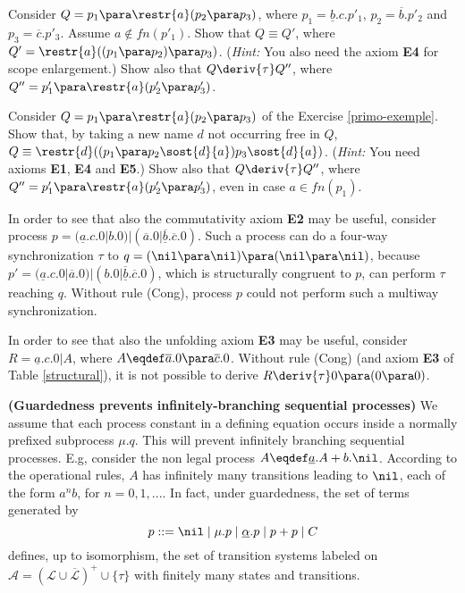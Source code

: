 \begin{exercise}\label{primo-exemple}
Consider $Q = p_1 \para \restr{a}(p_2 \para p_3)$, where $p_1 = \underline{b}.c.p'_1$, $p_2 = \overline{b}.p'_2$ 
and $p_3 = \overline{c}.p'_3$. Assume $a \not\in fn(p'_1)$. Show that $Q \equiv Q'$, 
where $Q' = \restr{a}((p_1 \para p_2) \para p_3)$.
({\em Hint:} You also need the axiom {\bf E4} for scope enlargement.) 
Show also that $Q \deriv{\tau} Q''$, where $Q'' =  p'_1 \para \restr{a}(p'_2 \para p'_3)$.
\fine
\end{exercise}

\begin{exercise}
Consider $Q = p_1 \para \restr{a}(p_2 \para p_3)$ of the Exercise \ref{primo-exemple}. Show that, by taking a new name $d$
not occurring free in $Q$, $Q \equiv \restr{d}((p_1 \para p_2\sost{d}{a}) p_3\sost{d}{a})$.
({\em Hint:} You need axioms {\bf E1}, {\bf E4} and {\bf E5}.) 
Show also that $Q \deriv{\tau} Q''$, where $Q'' =  p'_1 \para \restr{a}(p'_2 \para p'_3)$, even in case $a \in fn(p_1)$.
\fine
\end{exercise}


\begin{example}\label{comm-needed}
In order to see that also the commutativity axiom {\bf E2} may be useful, consider process $p = 
 (\underline{a}.c.0 | b.0) | (\overline{a}.0 | \underline{\overline{b}}.\overline{c}.0)$. Such a process
 can do a four-way synchronization $\tau$ to $q = (\nil \para \nil) \para (\nil \para \nil)$, because $p' = 
 (\underline{a}.c.0 | \overline{a}.0) | (b.0 | \underline{\overline{b}}.\overline{c}.0)$, which is structurally 
 congruent to $p$, can perform $\tau$ reaching $q$.
Without rule (Cong), process $p$ could not perform such a multiway synchronization.
\fine
\end{example}

\begin{example}\label{ax-cons-needed}
In order to see that also the unfolding axiom {\bf E3} may be useful, 
consider $R = \underline{a}.c.0 | A$, where $A \eqdef \overline{a}.0 \para \overline{c}.0$. Without rule (Cong) 
(and axiom {\bf E3} of Table \ref{structural}),
it is not possible to derive $R \deriv{\tau} 0 \para (0 \para 0)$. 
\fine
\end{example}


\begin{remark}\label{guarded-rec}{\bf (Guardedness prevents infinitely-branching sequential processes)} 
We assume that each process constant in a defining equation occurs
inside a normally prefixed subprocess $\mu.q$. This will prevent infinitely branching sequential processes.
E.g, consider the non legal process $A  \eqdef  \underline{a}.A + b.\nil$.
According to the operational rules, $A$ has infinitely many transitions leading to $\nil$, each of the form $a^nb$, for 
$n = 0, 1, ...$. 
In fact, under guardedness, the set of terms generated by 
\[ p ::= \nil \mid  \mu.p \mid  \underline{\alpha}.p \mid p+p  \mid  C\]
defines, up to isomorphism, the set of transition systems labeled on ${\mathcal A} = 
(\mathcal{L} \cup \overline{\mathcal L})^+ \cup \{\tau\}$ with finitely many states and transitions.
\fine
\end{remark}

